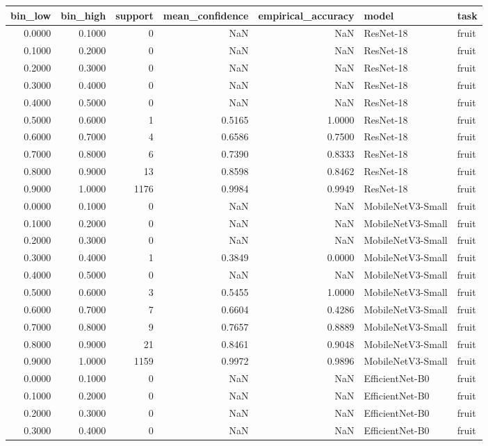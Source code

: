 \begin{tabular}{rrrrrll}
\toprule
bin_low & bin_high & support & mean_confidence & empirical_accuracy & model & task \\
\midrule
0.0000 & 0.1000 & 0 & NaN & NaN & ResNet-18 & fruit \\
0.1000 & 0.2000 & 0 & NaN & NaN & ResNet-18 & fruit \\
0.2000 & 0.3000 & 0 & NaN & NaN & ResNet-18 & fruit \\
0.3000 & 0.4000 & 0 & NaN & NaN & ResNet-18 & fruit \\
0.4000 & 0.5000 & 0 & NaN & NaN & ResNet-18 & fruit \\
0.5000 & 0.6000 & 1 & 0.5165 & 1.0000 & ResNet-18 & fruit \\
0.6000 & 0.7000 & 4 & 0.6586 & 0.7500 & ResNet-18 & fruit \\
0.7000 & 0.8000 & 6 & 0.7390 & 0.8333 & ResNet-18 & fruit \\
0.8000 & 0.9000 & 13 & 0.8598 & 0.8462 & ResNet-18 & fruit \\
0.9000 & 1.0000 & 1176 & 0.9984 & 0.9949 & ResNet-18 & fruit \\
0.0000 & 0.1000 & 0 & NaN & NaN & MobileNetV3-Small & fruit \\
0.1000 & 0.2000 & 0 & NaN & NaN & MobileNetV3-Small & fruit \\
0.2000 & 0.3000 & 0 & NaN & NaN & MobileNetV3-Small & fruit \\
0.3000 & 0.4000 & 1 & 0.3849 & 0.0000 & MobileNetV3-Small & fruit \\
0.4000 & 0.5000 & 0 & NaN & NaN & MobileNetV3-Small & fruit \\
0.5000 & 0.6000 & 3 & 0.5455 & 1.0000 & MobileNetV3-Small & fruit \\
0.6000 & 0.7000 & 7 & 0.6604 & 0.4286 & MobileNetV3-Small & fruit \\
0.7000 & 0.8000 & 9 & 0.7657 & 0.8889 & MobileNetV3-Small & fruit \\
0.8000 & 0.9000 & 21 & 0.8461 & 0.9048 & MobileNetV3-Small & fruit \\
0.9000 & 1.0000 & 1159 & 0.9972 & 0.9896 & MobileNetV3-Small & fruit \\
0.0000 & 0.1000 & 0 & NaN & NaN & EfficientNet-B0 & fruit \\
0.1000 & 0.2000 & 0 & NaN & NaN & EfficientNet-B0 & fruit \\
0.2000 & 0.3000 & 0 & NaN & NaN & EfficientNet-B0 & fruit \\
0.3000 & 0.4000 & 0 & NaN & NaN & EfficientNet-B0 & fruit \\

\end{tabular}
